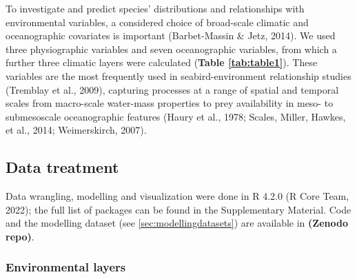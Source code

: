 \documentclass{article}
\begin{document}
To investigate and predict species' distributions and relationships with environmental variables, a considered choice of broad-scale climatic and oceanographic covariates is important (Barbet-Massin \& Jetz, 2014). We used three physiographic variables and seven oceanographic variables, from which a further three climatic layers were calculated (\textbf{Table \ref{tab:table1}}). These variables are the most frequently used in seabird-environment relationship studies (Tremblay et al., 2009), capturing processes at a range of spatial and temporal scales from macro-scale water-mass properties to prey availability in meso- to submesoscale oceanographic features (Haury et al., 1978; Scales, Miller, Hawkes, et al., 2014; Weimerskirch, 2007).

\hypertarget{data-treatment}{%
\subsection{Data treatment}\label{data-treatment}}

Data wrangling, modelling and visualization were done in R 4.2.0 (R Core Team, 2022); the full list of packages can be found in the Supplementary Material. Code and the modelling dataset (see \ref{sec:modellingdatasets}) are available in \textbf{(Zenodo repo)}.

\hypertarget{environmental-layers}{%
\subsubsection{Environmental layers}\label{environmental-layers}}
\end{document}
